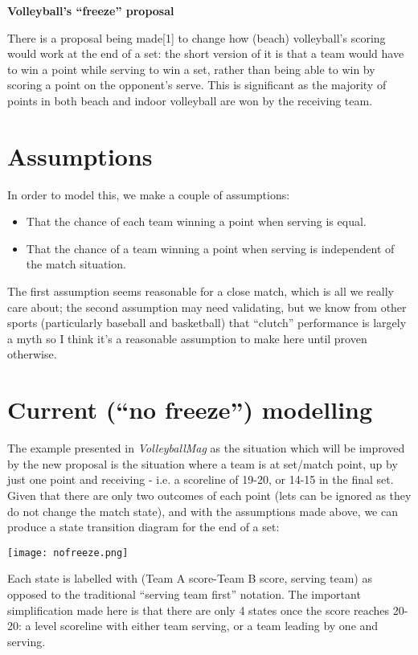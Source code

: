 \documentclass[a4paper,12pt]{article}
\begin{document}
\begin{center}
  {\LARGE \textbf{Volleyball's ``freeze'' proposal}}
\end{center}

There is a proposal being made[1] to change how (beach) volleyball's scoring
would work at the end of a set: the short version of it is that a team would
have to win a point while serving to win a set, rather than being able to win
by scoring a point on the opponent's serve. This is significant as the majority
of points in both beach and indoor volleyball are won by the receiving team.

\section{Assumptions}

In order to model this, we make a couple of assumptions:

\begin{itemize}
  \item That the chance of each team winning a point when serving is equal.
  \item That the chance of a team winning a point when serving is independent
    of the match situation.
\end{itemize}

The first assumption seems reasonable for a close match, which is all we really
care about; the second assumption may need validating, but we know from other
sports (particularly baseball and basketball) that ``clutch'' performance is
largely a myth so I think it's a reasonable assumption to make here until
proven otherwise.

\section{Current (``no freeze'') modelling}

The example presented in \textit{VolleyballMag} as the situation which will be
improved by the new proposal is the situation where a team is at set/match
point, up by just one point and receiving - i.e. a scoreline of 19-20, or 14-15
in the final set. Given that there are only two outcomes of each point (lets
can be ignored as they do not change the match state), and with the assumptions
made above, we can produce a state transition diagram for the end of a set:

\texttt{[image: nofreeze.png]}

Each state is labelled with (Team A score-Team B score, serving team) as
opposed to the traditional ``serving team first'' notation. The important
simplification made here is that there are only 4 states once the score
reaches 20-20: a level scoreline with either team serving, or a team leading by
one and serving.
\end{document}
